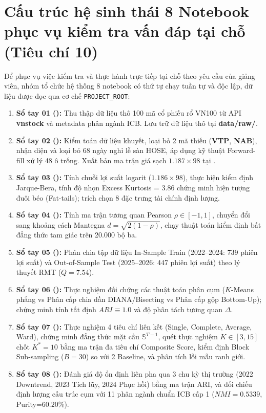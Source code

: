 \documentclass[12pt,a4paper,oneside,openany]{report}
\begin{document}
\section{Cấu trúc hệ sinh thái 8 Notebook phục vụ kiểm tra vấn đáp tại chỗ (Tiêu chí 10)}
Để phục vụ việc kiểm tra và thực hành trực tiếp tại chỗ theo yêu cầu của giảng viên, nhóm tổ chức hệ thống 8 notebook có thứ tự chạy tuần tự và độc lập, dữ liệu được đọc qua cơ chế \texttt{PROJECT\_ROOT}:
\begin{enumerate}
  \item \textbf{Sổ tay 01 ():}
  Thu thập dữ liệu thô 100 mã cổ phiếu rổ VN100 từ API \textbf{vnstock} và metadata phân ngành ICB. Lưu trữ dữ liệu thô tại \textbf{data/raw/}.
  \item \textbf{Sổ tay 02 ():}
  Kiểm toán dữ liệu khuyết, loại bỏ 2 mã thiếu (\textbf{VTP}, \textbf{NAB}), nhận diện và loại bỏ 68 ngày nghỉ lễ sàn HOSE, áp dụng kỹ thuật Forward-fill xử lý 48 ô trống. Xuất bản ma trận giá sạch $1.187 \times 98$ tại .
  \item \textbf{Sổ tay 03 ():}
  Tính chuỗi lợi suất logarit ($1.186 \times 98$), thực hiện kiểm định Jarque-Bera, tính độ nhọn Excess Kurtosis = 3.86 chứng minh hiện tượng đuôi béo (Fat-tails); trích chọn 8 đặc trưng tài chính định lượng.
  \item \textbf{Sổ tay 04 ():}
  Tính ma trận tương quan Pearson $\rho \in [-1, 1]$, chuyển đổi sang khoảng cách Mantegna $d = \sqrt{2(1-\rho)}$, chạy thuật toán kiểm định bất đẳng thức tam giác trên 20.000 bộ ba.
  \item \textbf{Sổ tay 05 ():}
  Phân chia tập dữ liệu In-Sample Train (2022--2024: 739 phiên lợi suất) và Out-of-Sample Test (2025--2026: 447 phiên lợi suất) theo lý thuyết RMT ($Q=7.54$).
  \item \textbf{Sổ tay 06 ():}
  Thực nghiệm đối chứng các thuật toán phân cụm ($K$-Means phẳng vs Phân cấp chia dần DIANA/Bisecting vs Phân cấp gộp Bottom-Up); chứng minh tính tất định $ARI \equiv 1.0$ và độ phân tách tương quan $\Delta$.
  \item \textbf{Sổ tay 07 ():}
  Thực nghiệm 4 tiêu chí liên kết (Single, Complete, Average, Ward), chứng minh đẳng thức mặt cầu $\mathbb{S}^{T-1}$, quét thực nghiệm $K \in [3, 15]$ chốt $K^*=10$ bằng ma trận đa tiêu chí Composite Score, kiểm định Block Sub-sampling ($B=30$) so với 2 Baseline, và phân tích lỗi mẫu ranh giới.
  \item \textbf{Sổ tay 08 ():}
  Đánh giá độ ổn định liên pha qua 3 chu kỳ thị trường (2022 Downtrend, 2023 Tích lũy, 2024 Phục hồi) bằng ma trận ARI, và đối chiếu định lượng cấu trúc cụm với 11 phân ngành chuẩn ICB cấp 1 ($NMI=0.5339$, Purity=$60.20\%$).
\end{enumerate}
\end{document}
